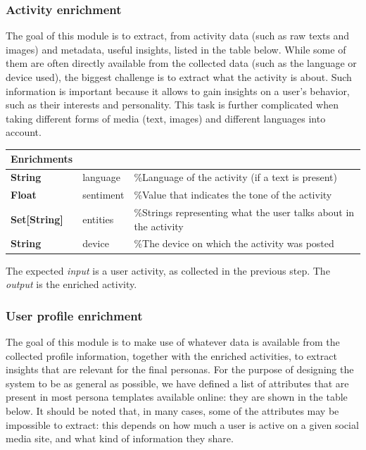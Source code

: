 \subsubsection{Activity enrichment}
\label{subsubsec:activity_enrichment}
The goal of this module is to extract, from activity data (such as raw texts and images) and metadata, useful insights, listed in the table below. While some of them are often directly available from the collected data (such as the language or device used), the biggest challenge is to extract what the activity is about. Such information is important because it allows to gain insights on a user's behavior, such as their interests and personality. This task is further complicated when taking different forms of media (text, images) and different languages into account.

\begin{center}
\begin{tabular}{lll}
\hline
Enrichments & & \\
\hline
\textbf{String} & language & \%Language of the activity (if a text is present) \\
\textbf{Float} & sentiment & \%Value that indicates the tone of the activity \\
\textbf{Set[String]} & entities & \%Strings representing what the user talks about in the activity\\
\textbf{String} & device & \%The device on which the activity was posted \\
\hline
\end{tabular}
\end{center}

The expected \emph{input} is a user activity, as collected in the previous step. The \emph{output} is the enriched activity.

\subsubsection{User profile enrichment}
\label{subsubsec:user_profile_enrichment}
The goal of this module is to make use of whatever data is available from the collected profile information, together with the enriched activities, to extract insights that are relevant for the final personas. For the purpose of designing the system to be as general as possible, we have defined a list of attributes that are present in most persona templates available online: they are shown in the table below. It should be noted that, in many cases, some of the attributes may be impossible to extract: this depends on how much a user is active on a given social media site, and what kind of information they share.

